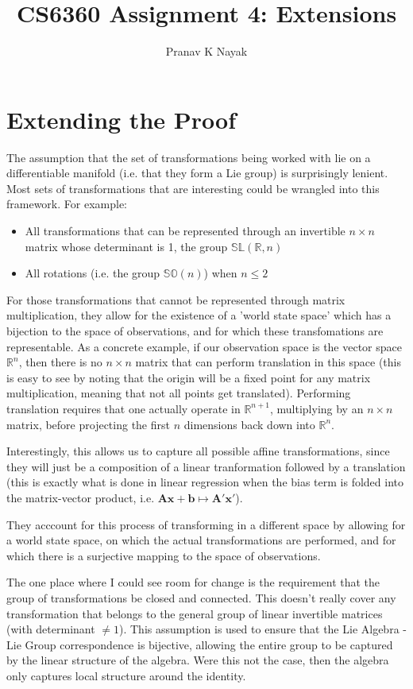 \documentclass{article}
\title{CS6360 Assignment 4: Extensions}
\author{Pranav K Nayak}
\date{}
\begin{document}
\maketitle
\section{Extending the Proof}
The assumption that the set of transformations being worked with lie on a differentiable manifold (i.e. that they form a Lie group) is surprisingly lenient. Most sets of transformations that are interesting could be wrangled into this framework. For example:
\begin{itemize}
\item All transformations that can be represented through an invertible $n \times n$ matrix whose determinant is 1, the group $\mathbb{SL}(\mathbb{R}, n)$
\item All rotations (i.e. the group $\mathbb{SO}(n)$) when $n \leq 2$
\end{itemize}
For those transformations that cannot be represented through matrix multiplication, they allow for the existence of a 'world state space' which has a bijection to the space of observations, and for which these transfomations are representable. As a concrete example, if our observation space is the vector space $\mathbb{R}^n$, then there is no $n \times n$ matrix that can perform translation in this space (this is easy to see by noting that the origin will be a fixed point for any matrix multiplication, meaning that not all points get translated). Performing translation requires that one actually operate in $\mathbb{R}^{n+1}$, multiplying by an $n \times n$ matrix, before projecting the first $n$ dimensions back down into $\mathbb{R}^n$. 

Interestingly, this allows us to capture all possible affine transformations, since they will just be a composition of a linear tranformation followed by a translation (this is exactly what is done in linear regression when the bias term is folded into the matrix-vector product, i.e. $\mathbf{A}\mathbf{x} + \mathbf{b} \mapsto \mathbf{A'}\mathbf{x'}$).

They acccount for this process of transforming in a different space by allowing for a world state space, on which the actual transformations are performed, and for which there is a surjective mapping to the space of observations.

The one place where I could see room for change is the requirement that the group of transformations be closed and connected. This doesn't really cover any transformation that belongs to the general group of linear invertible matrices (with determinant $\neq 1$). This assumption is used to ensure that the Lie Algebra - Lie Group correspondence is bijective, allowing the entire group to be captured by the linear structure of the algebra. Were this not the case, then the algebra only captures local structure around the identity.
\end{document}
